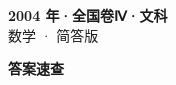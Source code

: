 \documentclass[zihao=-4, a4paper]{ctexart}
\begin{document}
\begin{center}
  {\Large\bfseries 2004 年·全国卷Ⅳ·文科}\\[4pt]
  {\large 数学 · 简答版}
\end{center}
\medskip
{}

\clearpage
{}
\begin{center}{\Large\bfseries 答案速查}\end{center}
\medskip

\end{document}

